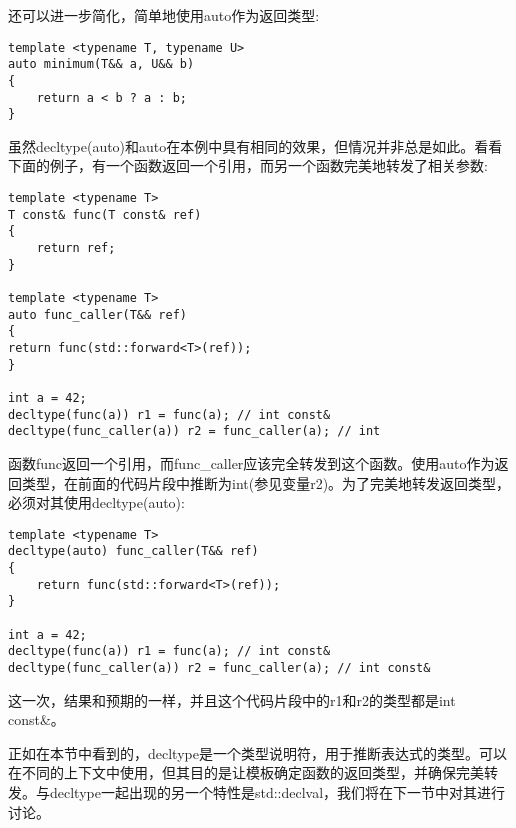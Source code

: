 还可以进一步简化，简单地使用auto作为返回类型:

\begin{lstlisting}[style=styleCXX]
template <typename T, typename U>
auto minimum(T&& a, U&& b)
{
	return a < b ? a : b;
}
\end{lstlisting}

虽然decltype(auto)和auto在本例中具有相同的效果，但情况并非总是如此。看看下面的例子，有一个函数返回一个引用，而另一个函数完美地转发了相关参数:

\begin{lstlisting}[style=styleCXX]
template <typename T>
T const& func(T const& ref)
{
	return ref;
}

template <typename T>
auto func_caller(T&& ref)
{
return func(std::forward<T>(ref));
}

int a = 42;
decltype(func(a)) r1 = func(a); // int const&
decltype(func_caller(a)) r2 = func_caller(a); // int
\end{lstlisting}

函数func返回一个引用，而func\_caller应该完全转发到这个函数。使用auto作为返回类型，在前面的代码片段中推断为int(参见变量r2)。为了完美地转发返回类型，必须对其使用decltype(auto):

\begin{lstlisting}[style=styleCXX]
template <typename T>
decltype(auto) func_caller(T&& ref)
{
	return func(std::forward<T>(ref));
}

int a = 42;
decltype(func(a)) r1 = func(a); // int const&
decltype(func_caller(a)) r2 = func_caller(a); // int const&
\end{lstlisting}

这一次，结果和预期的一样，并且这个代码片段中的r1和r2的类型都是int const\&。

正如在本节中看到的，decltype是一个类型说明符，用于推断表达式的类型。可以在不同的上下文中使用，但其目的是让模板确定函数的返回类型，并确保完美转发。与decltype一起出现的另一个特性是std::declval，我们将在下一节中对其进行讨论。









